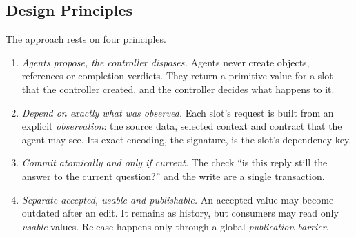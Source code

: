 \documentclass[10pt,journal,compsoc]{IEEEtran}
\theoremstyle{plain}
\theoremstyle{definition}
\begin{document}
\subsection{Design Principles}
The approach rests on four principles.
\begin{enumerate}
\item \emph{Agents propose, the controller disposes.} Agents never create objects, references or completion verdicts. They return a primitive value for a slot that the controller created, and the controller decides what happens to it.
\item \emph{Depend on exactly what was observed.} Each slot's request is built from an explicit \emph{observation}: the source data, selected context and contract that the agent may see. Its exact encoding, the signature, is the slot's dependency key.
\item \emph{Commit atomically and only if current.} The check ``is this reply still the answer to the current question?'' and the write are a single transaction.
\item \emph{Separate accepted, usable and publishable.} An accepted value may become outdated after an edit. It remains as history, but consumers may read only \emph{usable} values. Release happens only through a global \emph{publication barrier}.
\end{enumerate}
\end{document}

